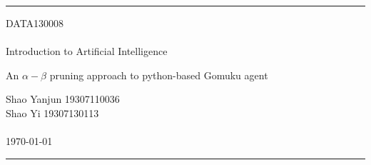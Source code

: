 \documentclass[a4paper, 11pt]{article} %
\begin{document}

\fancyhead[C]{}
\hrule \medskip %
\begin{minipage}{0.295\textwidth} %
    \raggedright
    DATA130008\\ %
    \footnotesize %
    \hfill\\
    Introduction to Artificial Intelligence\\ %
\end{minipage}
\begin{minipage}{0.4\textwidth} %
    \centering
    \Large %
    An $\alpha-\beta$ pruning approach to python-based Gomuku agent \\ %
    \normalsize %
\end{minipage}
\begin{minipage}{0.295\textwidth} %
    \raggedleft
    Shao Yanjun 19307110036\\
    Shao Yi 19307130113\\ %
    \footnotesize %
    \hfill\\
    \today\\ %
\end{minipage}
\medskip\hrule %
\bigskip
\end{document}
